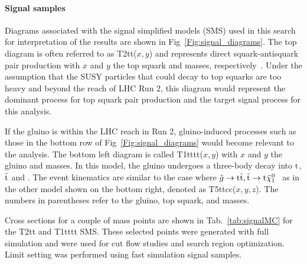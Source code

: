 \paragraph{Signal samples}

Diagrams associated with the signal simplified models (SMS) used in this search for interpretation of the results are shown in Fig~\ref{Fig:signal_diagrams}. The top diagram is often referred to as T2tt($x,y$) and represents direct squark-antisquark pair production with $x$ and $y$ the top squark and \chiOneZero masses, respectively~\cite{CMS-SMS-paper}. Under the assumption that the SUSY particles that could decay to top squarks are too heavy and beyond the reach of LHC Run 2, this diagram would represent the dominant process for top squark pair production and the target signal process for this analysis.

If the gluino is within the LHC reach in Run 2, gluino-induced processes such as those in the bottom row of Fig~\ref{Fig:signal_diagrams} would become relevant to the analysis. The bottom left diagram is called T1tttt($x,y$) with $x$ and $y$ the gluino and \chiOneZero masses.
In this model, the gluino undergoes a three-body decay into \ensuremath{\rm t}, \ensuremath{\rm \bar{t}} and 
\chiOneZero. The event kinematics are similar to the case
where
$\tilde{g}\to\mathrm{t}\tilde{{\mathrm t}}, \tilde{{\mathrm t}}\to\mathrm{t}\tilde{\chi}^{0}_{1}$~\cite{CMS-SMS-paper}
as in the other model shown on the bottom right, denoted as 
T5ttcc($x,y,z$).
The numbers in parentheses refer to the gluino, top squark, and 
\chiOneZero masses. 

Cross sections for a couple of mass points are shown in 
Tab.~\ref{tab:signalMC} for the T2tt and T1tttt SMS. 
These selected points were generated with full simulation and were used for
cut flow studies and search region optimization. Limit setting was performed
using fast simulation signal samples.


